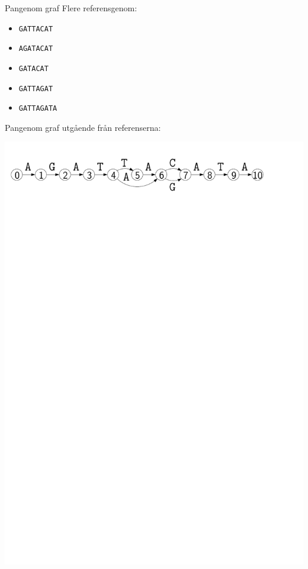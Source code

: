 \documentclass[11pt, aspectratio=169, table]{beamer}
\begin{document}
\begin{frame}{Pangenom graf}
Flere referensgenom:
\begin{itemize}
\item {\tt GATTACAT}
\item {\tt AGATACAT}
\item {\tt GATACAT}
\item {\tt GATTAGAT}
\item {\tt GATTAGATA}
\end{itemize}

\vfill

Pangenom graf utgående från referenserna:
\begin{center}
\includegraphics[width=.9\textwidth]{graph.pdf}
\end{center}
\end{frame}
\end{document}
